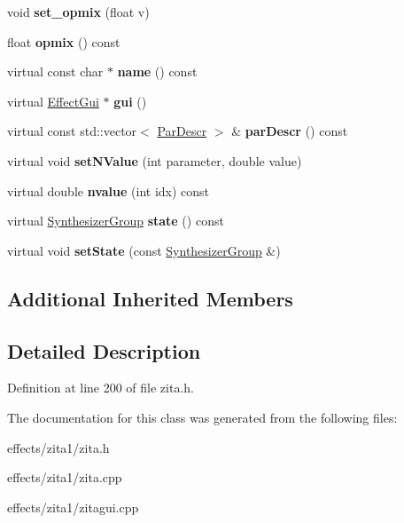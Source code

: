 \begin{DoxyCompactItemize}
void {\bfseries set\+\_\+opmix} (float v)
\item 
\mbox{\label{class_ms_1_1_zita_reverb_a76ad3436cda8865dedaeb41270605be7}} 
float {\bfseries opmix} () const
\item 
\mbox{\label{class_ms_1_1_zita_reverb_a726f57e72aba996c0956bdb692105990}} 
virtual const char $\ast$ {\bfseries name} () const
\item 
\mbox{\label{class_ms_1_1_zita_reverb_a6c91087c6e6fc578bfe9a77cf62d2a54}} 
virtual \hyperlink{class_ms_1_1_effect_gui}{Effect\+Gui} $\ast$ {\bfseries gui} ()
\item 
\mbox{\label{class_ms_1_1_zita_reverb_aa53ac21a3be36f124a91b7430aad8cd2}} 
virtual const std\+::vector$<$ \hyperlink{struct_ms_1_1_par_descr}{Par\+Descr} $>$ \& {\bfseries par\+Descr} () const
\item 
\mbox{\label{class_ms_1_1_zita_reverb_acf04bf24554ee26de5ab75c53409b737}} 
virtual void {\bfseries set\+N\+Value} (int parameter, double value)
\item 
\mbox{\label{class_ms_1_1_zita_reverb_a0f195e07c97016d464abec3274627e5e}} 
virtual double {\bfseries nvalue} (int idx) const
\item 
\mbox{\label{class_ms_1_1_zita_reverb_aefd3e5d06c83cd800f591b2d1c52e855}} 
virtual \hyperlink{class_ms_1_1_synthesizer_group}{Synthesizer\+Group} {\bfseries state} () const
\item 
\mbox{\label{class_ms_1_1_zita_reverb_a8e294be3a897083abde8bf61879e929c}} 
virtual void {\bfseries set\+State} (const \hyperlink{class_ms_1_1_synthesizer_group}{Synthesizer\+Group} \&)
\end{DoxyCompactItemize}
\subsection*{Additional Inherited Members}


\subsection{Detailed Description}


Definition at line 200 of file zita.\+h.



The documentation for this class was generated from the following files\+:\begin{DoxyCompactItemize}
\item 
effects/zita1/zita.\+h\item 
effects/zita1/zita.\+cpp\item 
effects/zita1/zitagui.\+cpp\end{DoxyCompactItemize}
